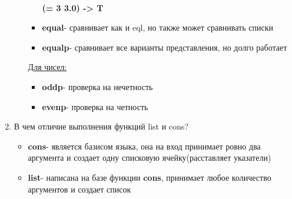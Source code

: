 \begin{enumerate}
\begin{enumerate}
\begin{itemize}
                        \\ \textbf{(= 3 3.0) -> T}
                    \item \textbf{equal}- сравнивает как и eql, но также может сравнивать списки
                    \item \textbf{equalp}- сравнивает все варианты представления, но долго работает
                \end{itemize}
            \underline{Для чисел:}
                \begin{itemize}
                    \item \textbf{oddp}- проверка на нечетность
                    \item \textbf{evenp}- проверка на четность
                \end{itemize}
        \end{enumerate}
    \item В чем отличие выполнения функций list и cons?
    	 \begin{itemize}
        		\item \textbf{cons}- является базисом языка, она на вход принимает ровно два аргумента и создает одну списковую ячейку(расставляет указатели)
        		\item \textbf{list}- написана на базе функции \textbf{cons}, принимает любое количество аргументов и создает список
	\end{itemize}
\end{enumerate}

